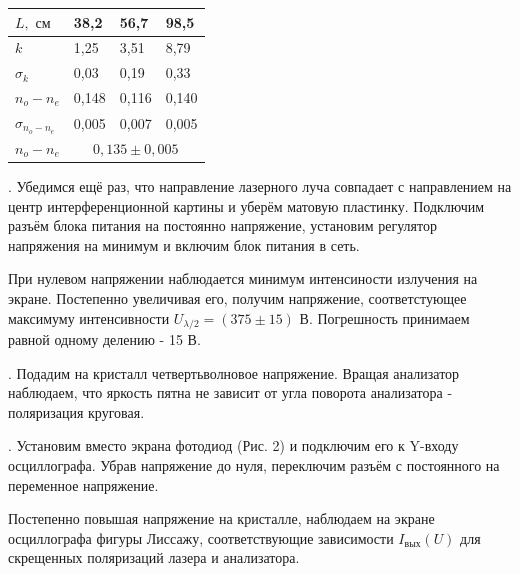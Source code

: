 \documentclass[a4paper,12pt]{article} %
\begin{document}
\medskip

\begin{table}[h!]
\begin{tabular}{|l|lll|}
\hline
$L, \text{ см}$      & \multicolumn{1}{l|}{38,2}  & \multicolumn{1}{l|}{56,7}  & 98,5  \\ \hline
$k$                  & \multicolumn{1}{l|}{1,25}  & \multicolumn{1}{l|}{3,51}  & 8,79  \\ \hline
$\sigma_k$           & \multicolumn{1}{l|}{0,03}  & \multicolumn{1}{l|}{0,19}  & 0,33  \\ \hline
$n_o - n_e$          & \multicolumn{1}{l|}{0,148} & \multicolumn{1}{l|}{0,116} & 0,140 \\ \hline
$\sigma_{n_o - n_e}$ & \multicolumn{1}{l|}{0,005} & \multicolumn{1}{l|}{0,007} & 0,005 \\ \hline
$n_o - n_e$          & \multicolumn{3}{c|}{$0,135 \pm 0,005$}                          \\ \hline
\end{tabular}
\end{table}

\medskip

. Убедимся ещё раз, что направление лазерного луча совпадает с направлением на центр интерференционной картины и уберём матовую пластинку. Подключим разъём блока питания на постоянно напряжение, установим регулятор напряжения на минимум и включим блок питания в сеть.

\medskip

\noindent При нулевом напряжении наблюдается минимум интенсиности излучения на экране. Постепенно увеличивая его, получим напряжение, соответстующее максимуму интенсивности $U_{\lambda/2} = (375 \pm 15) \text{ В}$. Погрешность принимаем равной одному делению - 15 В.

\medskip

. Подадим на кристалл четвертьволновое напряжение. Вращая анализатор наблюдаем, что яркость пятна не зависит от угла поворота анализатора - поляризация круговая.

\medskip

. Установим вместо экрана фотодиод (Рис. 2) и подключим его
к Y-входу осциллографа. Убрав напряжение до нуля, переключим разъём с постоянного на переменное напряжение.

\medskip

\noindent Постепенно повышая напряжение на кристалле, наблюдаем на
экране осциллографа фигуры Лиссажу, соответствующие зависимости $I_\text{вых}(U)$ для скрещенных поляризаций лазера
и анализатора. 
\end{document}

